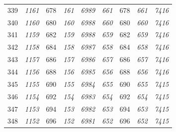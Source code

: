 \documentclass[10pt,fleqn]{article}
\begin{document}
\begin{longtable}{c|cccccccc}
339 & {\color{blue} \it 1161 \rm} & {\color{black} 678} & {\color{blue} \it 161 \rm} & {\color{blue} \it 6989 \rm} & {\color{blue} \it 661 \rm} & {\color{black} 678} & {\color{blue} \it 661 \rm} & {\color{blue} \it 7416 \rm} \\
340 & {\color{blue} \it 1160 \rm} & {\color{black} 680} & {\color{blue} \it 160 \rm} & {\color{blue} \it 6988 \rm} & {\color{blue} \it 660 \rm} & {\color{black} 680} & {\color{blue} \it 660 \rm} & {\color{blue} \it 7416 \rm} \\
341 & {\color{blue} \it 1159 \rm} & {\color{black} 682} & {\color{blue} \it 159 \rm} & {\color{blue} \it 6988 \rm} & {\color{blue} \it 659 \rm} & {\color{black} 682} & {\color{blue} \it 659 \rm} & {\color{blue} \it 7416 \rm} \\
342 & {\color{blue} \it 1158 \rm} & {\color{black} 684} & {\color{blue} \it 158 \rm} & {\color{blue} \it 6987 \rm} & {\color{blue} \it 658 \rm} & {\color{black} 684} & {\color{blue} \it 658 \rm} & {\color{blue} \it 7416 \rm} \\
343 & {\color{blue} \it 1157 \rm} & {\color{black} 686} & {\color{blue} \it 157 \rm} & {\color{blue} \it 6986 \rm} & {\color{blue} \it 657 \rm} & {\color{black} 686} & {\color{blue} \it 657 \rm} & {\color{blue} \it 7416 \rm} \\
344 & {\color{blue} \it 1156 \rm} & {\color{black} 688} & {\color{blue} \it 156 \rm} & {\color{blue} \it 6985 \rm} & {\color{blue} \it 656 \rm} & {\color{black} 688} & {\color{blue} \it 656 \rm} & {\color{blue} \it 7416 \rm} \\
345 & {\color{blue} \it 1155 \rm} & {\color{black} 690} & {\color{blue} \it 155 \rm} & {\color{blue} \it 6984 \rm} & {\color{blue} \it 655 \rm} & {\color{black} 690} & {\color{blue} \it 655 \rm} & {\color{blue} \it 7415 \rm} \\
346 & {\color{blue} \it 1154 \rm} & {\color{black} 692} & {\color{blue} \it 154 \rm} & {\color{blue} \it 6983 \rm} & {\color{blue} \it 654 \rm} & {\color{black} 692} & {\color{blue} \it 654 \rm} & {\color{blue} \it 7415 \rm} \\
347 & {\color{blue} \it 1153 \rm} & {\color{black} 694} & {\color{blue} \it 153 \rm} & {\color{blue} \it 6982 \rm} & {\color{blue} \it 653 \rm} & {\color{black} 694} & {\color{blue} \it 653 \rm} & {\color{blue} \it 7415 \rm} \\
348 & {\color{blue} \it 1152 \rm} & {\color{black} 696} & {\color{blue} \it 152 \rm} & {\color{blue} \it 6981 \rm} & {\color{blue} \it 652 \rm} & {\color{black} 696} & {\color{blue} \it 652 \rm} & {\color{blue} \it 7415 \rm} \\

\end{longtable}
\end{document}
